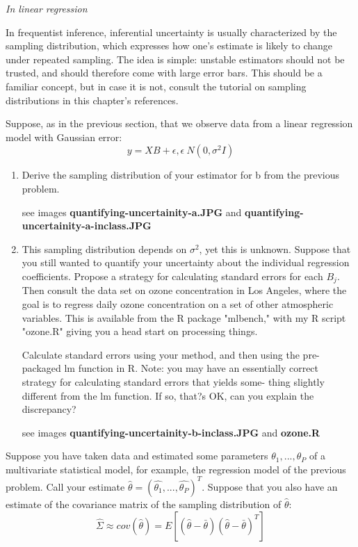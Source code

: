 \documentclass{homework}
\begin{document}
\par \noindent \textit{In linear regression}
\par \noindent In frequentist inference, inferential uncertainty is usually characterized by the sampling distribution, which expresses how one's estimate is likely to change under repeated sampling. The idea is simple: unstable estimators should not be trusted, and should therefore come with large error bars. This should be a familiar concept, but in case it is not, consult the tutorial on sampling distributions in this chapter's references.
\par \noindent Suppose, as in the previous section, that we observe data from a linear regression model with Gaussian error:
$$y = XB + \epsilon ,    \epsilon ~ N(0,\sigma^2I)$$

\begin{enumerate}[label=(\Alph*)]
\item Derive the sampling distribution of your estimator for b from the previous problem.
\par * see images \textbf{quantifying-uncertainity-a.JPG}  and \textbf{quantifying-uncertainity-a-inclass.JPG}

\item This sampling distribution depends on $\sigma^2$, yet this is unknown. Suppose that you still wanted to quantify your uncertainty about the individual regression coefficients. Propose a strategy for calculating standard errors for each $B_j$. Then consult the data set on ozone concentration in Los Angeles, where the goal is to regress daily ozone concentration on a set of other atmospheric variables. This is available from the R package "mlbench," with my R script "ozone.R" giving you a head start on processing things.
\par Calculate standard errors using your method, and then using the pre-packaged lm function in R. Note: you may have an essentially correct strategy for calculating standard errors that yields some- thing slightly different from the lm function. If so, that?s OK, can you explain the discrepancy?
\par * see images \textbf{quantifying-uncertainity-b-inclass.JPG}  and \textbf{ozone.R}

\end{enumerate}

Suppose you have taken data and estimated some parameters $\theta_1, . . . , \theta_P$ of a multivariate statistical model, for example, the regression model of the previous problem. Call your estimate $\hat{\theta} = (\hat{\theta_1}, . . . , \hat{\theta_P})^T$. Suppose that you also have an estimate of the covariance matrix of the sampling distribution of $\hat{\theta}$:
$$\hat{\Sigma} \approx cov(\hat{\theta})= E[ (\hat{\theta} - \bar{\theta})(\hat{\theta} - \bar{\theta})^T]$$
\end{document}
